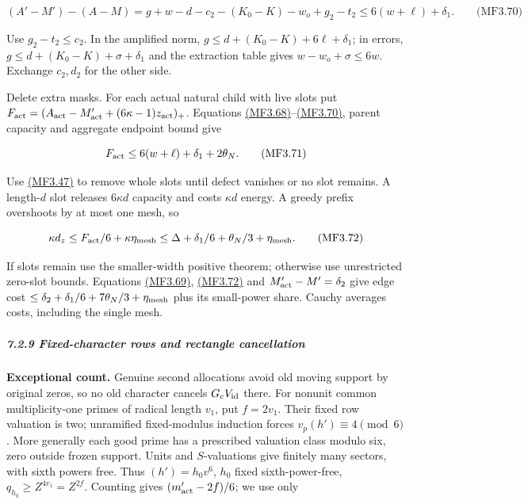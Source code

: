 \label{mf:eq:B3.70}

\[
(A'-M')-(A-M)
=g+w-d-c_2-(K_0-K)-w_o+g_2-t_2
\le6(w+\ell)+\delta_1.
\qquad\text{(MF3.70)}
\]

Use \(g_2-t_2\le c_2\). In the amplified norm, \(g\le d+(K_0-K)+6\ell+\delta_1\); in errors, \(g\le d+(K_0-K)+\sigma+\delta_1\) and the extraction table gives \(w-w_o+\sigma\le6w\). Exchange \(c_2,d_2\) for the other side.

Delete extra masks. For each actual natural child with live slots put \(F_{\rm act}=(A_{\rm act}-M'_{\rm act}+(6\kappa-1)z_{\rm act})_+\). Equations \protect\hyperlink{mf:eq:B3.68}{(MF3.68)}--\protect\hyperlink{mf:eq:B3.70}{(MF3.70)}, parent capacity and aggregate endpoint bound give

\hypertarget{mf:eq:B3.71}{}

\label{mf:eq:B3.71}

\[
F_{\rm act}\le6(w+\ell)+\delta_1+2\theta_N.
\qquad\text{(MF3.71)}
\]

Use \protect\hyperlink{mf:eq:B3.47}{(MF3.47)} to remove whole slots until defect vanishes or no slot remains. A length-\(d\) slot releases \(6\kappa d\) capacity and costs \(\kappa d\) energy. A greedy prefix overshoots by at most one mesh, so

\hypertarget{mf:eq:B3.72}{}

\label{mf:eq:B3.72}

\[
\kappa d_z\le F_{\rm act}/6+\kappa\eta_{\rm mesh}
\le\Delta+\delta_1/6+\theta_N/3+\eta_{\rm mesh}.
\qquad\text{(MF3.72)}
\]

If slots remain use the smaller-width positive theorem; otherwise use unrestricted zero-slot bounds. Equations \protect\hyperlink{mf:eq:B3.69}{(MF3.69)}, \protect\hyperlink{mf:eq:B3.72}{(MF3.72)} and \(M'_{\rm act}-M'=\delta_2\) give edge cost \(\le\delta_2+\delta_1/6+7\theta_N/3+\eta_{\rm mesh}\) plus its small-power share. Cauchy averages costs, including the single mesh.

\hypertarget{fixed-character-rows-and-rectangle-cancellation}{}

\label{fixed-character-rows-and-rectangle-cancellation}

\hypertarget{fixed-character-rows-and-rectangle-cancellation-heading-2}{%
\subparagraph{7.2.9 Fixed-character rows and rectangle cancellation}}

\textbf{Exceptional count.} Genuine second allocations avoid old moving support by original zeros, so no old character cancels \(G_cV_{\rm id}\) there. For nonunit common multiplicity-one primes of radical length \(v_1\), put \(f=2v_1\). Their fixed row valuation is two; unramified fixed-modulus induction forces \(v_p(h')\equiv4\pmod6\). More generally each good prime has a prescribed valuation class modulo six, zero outside frozen support. Units and \(S\)-valuations give finitely many sectors, with sixth powers free. Thus \((h')=h_0v^6\), \(h_0\) fixed sixth-power-free, \(q_{h_0}\ge Z^{4v_1}=Z^{2f}\). Counting gives \((m'_{\rm act}-2f)/6\); we use only

